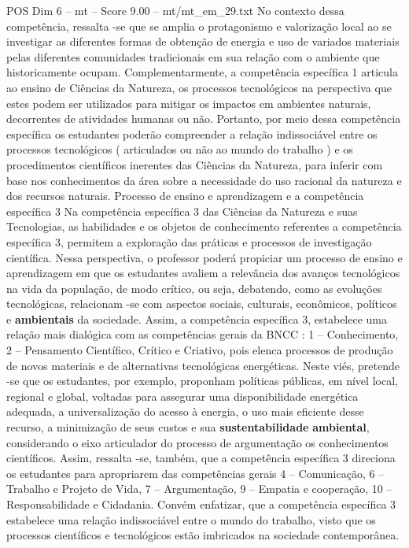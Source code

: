 \begin{textsample}{POS Dim 6 – mt – Score 9.00 – mt/mt\_em\_29.txt}
No contexto dessa competência, ressalta -se que se amplia o protagonismo e valorização local ao se investigar as diferentes formas de obtenção de energia e uso de variados materiais pelas diferentes comunidades tradicionais em sua relação com o ambiente que historicamente ocupam.
Complementarmente, a competência específica 1 articula ao ensino de Ciências da Natureza, os processos tecnológicos na perspectiva que estes podem ser utilizados para mitigar os impactos em ambientes naturais, decorrentes de atividades humanas ou não.
Portanto, por meio dessa competência específica os estudantes poderão compreender a relação indissociável entre os processos tecnológicos ( articulados ou não ao mundo do trabalho ) e os procedimentos científicos inerentes das Ciências da Natureza, para inferir com base nos conhecimentos da área sobre a necessidade do uso racional da natureza e dos recursos naturais.
Processo de ensino e aprendizagem e a competência específica 3 Na competência específica 3 das Ciências da Natureza e suas Tecnologias, as habilidades e os objetos de conhecimento referentes a competência específica 3, permitem a exploração das práticas e processos de investigação científica.
Nessa perspectiva, o professor poderá propiciar um processo de ensino e aprendizagem em que os estudantes avaliem a relevância dos avanços tecnológicos na vida da população, de modo crítico, ou seja, debatendo, como as evoluções tecnológicas, relacionam -se com aspectos sociais, culturais, econômicos, políticos e \textbf{ambientais} da sociedade.
Assim, a competência específica 3, estabelece uma relação mais dialógica com as competências gerais da BNCC : 1 – Conhecimento, 2 – Pensamento Científico, Crítico e Criativo, pois elenca processos de produção de novos materiais e de alternativas tecnológicas energéticas.
Neste viés, pretende -se que os estudantes, por exemplo, proponham políticas públicas, em nível local, regional e global, voltadas para assegurar uma disponibilidade energética adequada, a universalização do acesso à energia, o uso mais eficiente desse recurso, a minimização de seus custos e sua \textbf{sustentabilidade} \textbf{ambiental}, considerando o eixo articulador do processo de argumentação os conhecimentos científicos.
Assim, ressalta -se, também, que a competência específica 3 direciona os estudantes para apropriarem das competências gerais 4 – Comunicação, 6 – Trabalho e Projeto de Vida, 7 – Argumentação, 9 – Empatia e cooperação, 10 – Responsabilidade e Cidadania.
Convém enfatizar, que a competência específica 3 estabelece uma relação indissociável entre o mundo do trabalho, visto que os processos científicos e tecnológicos estão imbricados na sociedade contemporânea.

\end{textsample}
